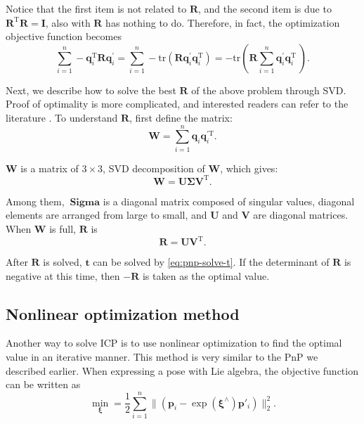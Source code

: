 Notice that the first item is not related to $\bm{R}$, and the second item is due to $\bm{R}^\mathrm{T}\bm{R}=\bm{I}$, also with $\bm{ R}$ has nothing to do. Therefore, in fact, the optimization objective function becomes
\begin{equation}
\sum\limits_{i = 1}^n - \bm{q}_i^\mathrm{T} \bm{R} \bm{q}^\prime_i = \sum\limits_{i = 1}^n - \mathrm{tr} \left( \bm{R} \bm{q}_i^{\prime} \bm{q}^{\mathrm{T}}_i \right) = - \mathrm{tr} \left ( \bm{R} \sum\limits_{i = 1}^n \bm{q}_i^{\prime} \bm{q}^{\mathrm{T}}_i \ \right).
\end{equation}

Next, we describe how to solve the best $\bm{R}$ of the above problem through SVD. Proof of optimality is more complicated, and interested readers can refer to the literature \cite{Arun1987, PomerleauColasSiegwart2015}. To understand $\bm{R}$, first define the matrix:
\begin{equation}
\bm{W} = \sum\limits_{i = 1}^n \bm{q}_i \bm{q}^{\prime \mathrm{T}}_i.
\end{equation}

$\bm{W}$ is a matrix of $3 \times 3$, SVD decomposition of $\bm{W}$, which gives:
\begin{equation}
\bm{W} = \bm{U \Sigma V}^\mathrm{T}.
\end{equation}

Among them, $\bm{\ Sigma}$ is a diagonal matrix composed of singular values, diagonal elements are arranged from large to small, and $\bm{U}$ and $\bm{V}$ are diagonal matrices. When $\bm{W}$ is full, $\bm{R}$ is
\begin{equation}
\bm{R} = \bm{U} \bm{V}^\mathrm{T}.
\end{equation}

After $\bm{R}$ is solved, $\bm{t}$ can be solved by \eqref{eq:pnp-solve-t}. If the determinant of $\bm{R}$ is negative at this time, then $-\bm{R}$ is taken as the optimal value.

\subsection{Nonlinear optimization method}
Another way to solve ICP is to use nonlinear optimization to find the optimal value in an iterative manner. This method is very similar to the PnP we described earlier. When expressing a pose with Lie algebra, the objective function can be written as
\begin{equation}
\mathop {\min }\limits_{\boldsymbol{\xi}} = \frac{1}{2} \sum\limits_{i = 1}^n\| {\left( {{{\bm{p} }_i} - \exp \left( \boldsymbol{\xi}^\wedge \right) {\bm{p}}'_i} \right)} \|^2_2.
\end{equation}

